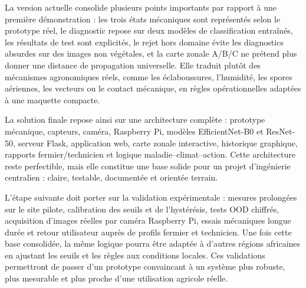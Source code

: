﻿\documentclass[11pt,a4paper,openany]{report}
\begin{document}
La version actuelle consolide plusieurs points importants par rapport à une première démonstration : les trois états mécaniques sont représentés selon le prototype réel, le diagnostic repose sur deux modèles de classification entraînés, les résultats de test sont explicités, le rejet hors domaine évite les diagnostics absurdes sur des images non végétales, et la carte zonale A/B/C ne prétend plus donner une distance de propagation universelle. Elle traduit plutôt des mécanismes agronomiques réels, comme les éclaboussures, l'humidité, les spores aériennes, les vecteurs ou le contact mécanique, en règles opérationnelles adaptées à une maquette compacte.

La solution finale repose ainsi sur une architecture complète : prototype mécanique, capteurs, caméra, Raspberry Pi, modèles EfficientNet-B0 et ResNet-50, serveur Flask, application web, carte zonale interactive, historique graphique, rapports fermier/technicien et logique maladie--climat--action. Cette architecture reste perfectible, mais elle constitue une base solide pour un projet d'ingénierie centralien : claire, testable, documentée et orientée terrain.

L'étape suivante doit porter sur la validation expérimentale : mesures prolongées sur le site pilote, calibration des seuils et de l'hystérésis, tests OOD chiffrés, acquisition d'images réelles par caméra Raspberry Pi, essais mécaniques longue durée et retour utilisateur auprès de profils fermier et technicien. Une fois cette base consolidée, la même logique pourra être adaptée à d'autres régions africaines en ajustant les seuils et les règles aux conditions locales. Ces validations permettront de passer d'un prototype convaincant à un système plus robuste, plus mesurable et plus proche d'une utilisation agricole réelle.



\end{document}
